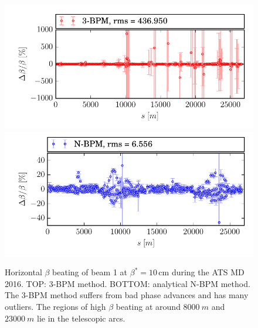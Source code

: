 \begin{figure}
	\centering
  \includegraphics[width=.7\linewidth]{10cm_b1_x_3bpm}
    \includegraphics[width=.7\linewidth]{10cm_b1_x_nbpm}
	\caption{Horizontal $ \beta $ beating of beam 1 at $ \beta^*=10\,\text{cm} $ during the ATS MD 2016. TOP: 3-BPM method. BOTTOM: analytical N-BPM method. The 3-BPM method suffers from bad phase advances and has many outliers. The regions of high $ \beta $ beating at around $ \SI{8000}{m} $ and $ \SI{23000}{m} $ lie in the telescopic arcs. }
	\label{fig:10cm_beam1_hor_3bpm}
\end{figure}
%
